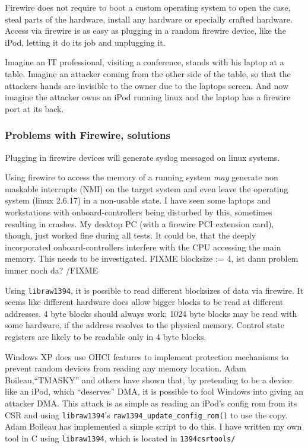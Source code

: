 Firewire does not require to boot a custom operating system to open the case,
steal parts of the hardware, install any hardware or specially crafted hardware.
Access via firewire is as easy as plugging in a random firewire device, like the
iPod, letting it do its job and unplugging it.

Imagine an IT professional, visiting a conference, stands with his laptop at a
table.  Imagine an attacker coming from the other side of the table, so that the
attackers hands are invisible to the owner due to the laptops screen. And now
imagine the attacker owns an iPod running linux and the laptop has a firewire
port at its back.



\subsubsection{Problems with Firewire, solutions}

Plugging in firewire devices will generate syslog messaged on linux systems.

Using firewire to access the memory of a running system \emph{may} generate non
maskable interrupts (NMI) on the target system and even leave the operating
system (linux 2.6.17) in a non-usable state. I have seen some laptops and
workstations with onboard-controllers being disturbed by this, sometimes
resulting in crashes. My desktop PC (with a firewire PCI extension card),
though, just worked fine during all tests. It could be, that the deeply
incorporated onboard-controllers interfere with the CPU accessing the main
memory. This needs to be investigated. FIXME blocksize := 4, ist dann problem
immer noch da? /FIXME

Using \texttt{libraw1394}, it is possible to read different blocksizes of data
via firewire.  It seems like different hardware does allow bigger blocks to be
read at different addresses. 4 byte blocks should always work; 1024 byte blocks
may be read with some hardware, if the address resolves to the physical memory.
Control state registers are likely to be readable only in 4 byte blocks.

\label{windows-dma} Windows XP does use OHCI features to implement protection
mechanisms to prevent random devices from reading any memory location.  Adam
Boileau,``TMASKY'' and others have shown \cite{rux2k6firewire:2006} that, by
pretending to be a device like an iPod, which ``deserves'' DMA, it is possible
to fool Windows into giving an attacker DMA.  This attack is as simple as
reading an iPod's config rom from its CSR and using \texttt{libraw1394}'s
\texttt{raw1394\_update\_config\_rom()} to use the copy.  Adam Boileau has
implemented a simple script to do this. I have written my own tool in C using
\texttt{libraw1394}, which is located in \texttt{1394csrtools/}




